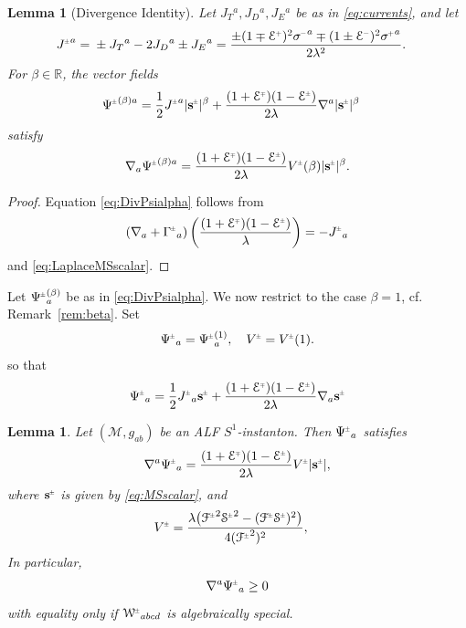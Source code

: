 \documentclass[a4paper,11pt,reqno]{amsart}
\newcommand{\Reals}{\mathbb{R}}
\newcommand{\Scal}{\mathop{\rm Scal}}
\newcommand{\cM}{\mathcal{M}}
\theoremstyle{plain}
\newtheorem{lemma}[thm]{Lemma}
\renewcommand{\P}[1]{{{#1}^{\hspace{-.5pt}\scaleto{+}{4pt}}}}
\newcommand{\M}[1]{{{#1}^{\hspace{-.5pt}\scaleto{-}{4pt}}}}
\newcommand{\PM}[1]{{{#1}^{\hspace{-.5pt}\scaleto{\pm}{3.5pt}}}}
\newcommand{\MP}[1]{{{#1}^{\hspace{-.5pt}\scaleto{\mp}{3.5pt}}}}
\def\Wcal{\mathcal{W}}
\def\Fcal{\mathcal{F}}
\def\Ecal{\mathcal{E}}
\def\Scal{\mathcal{S}}
\def\sbold{\mathbf{s}}
\numberwithin{equation}{section}
\begin{document}
\begin{lemma}[Divergence Identity]
Let $J_{T}{}^{a}, J_{D}{}^{a}, J_{E}{}^{a}$ be as in \eqref{eq:currents}, and let  
\begin{align} \label{eq:Jcurrdef}
\PM{J}^{a}={}&\pm J_{T}{}^{a}  - 2 J_{D}{}^{a} \pm J_{E}{}^{a}
 = \frac{\pm (1 \mp \P{\Ecal})^2 \M{\sigma}^{a} \mp  (1 \pm \M{\Ecal})^2 \P{\sigma}^{a}}{2 \lambda^2}.
\end{align} 
For $\beta \in \Reals$,  the vector fields
\begin{align}
\PM{\Psi}^{(\beta)a}={}& \frac{1}{2} \PM{J}^{a} |\PM{\sbold}|^\beta
+ \frac{(1+\MP{\Ecal})(1-\PM{\Ecal})}{2\lambda}\nabla^{a}|\PM{\sbold}|^\beta
\end{align}
satisfy
\begin{align} \label{eq:DivPsialpha}
\nabla_a \PM{\Psi}^{(\beta)a} = \frac{(1 + \MP{\Ecal}) (1 -  \PM{\Ecal})}{2\lambda} \PM{V}(\beta) |\PM{\sbold}|^\beta.
\end{align}
\end{lemma}
\begin{proof}
Equation \eqref{eq:DivPsialpha} follows from 
\begin{align}
\left( \nabla_a + \PM{\Gamma}_a \right) \left( \frac{(1+\MP{\Ecal})(1-\PM{\Ecal})}{\lambda}\right) = - \PM{J}_{a} 
\end{align}
and \eqref{eq:LaplaceMSscalar}.
\end{proof}


%




Let $\PM{\Psi}^{(\beta)}_a$ be as in \eqref{eq:DivPsialpha}. We now restrict to the case $\beta=1$, cf. Remark~\ref{rem:beta}. 
Set  
\begin{align} 
\PM{\Psi}_a  = \PM{\Psi}^{(1)}_a  , \quad \PM{V} = \PM{V}(1) .
\end{align}
so that
\begin{align}  \label{eq:Psi-def} 
\PM{\Psi}_a
= \frac{1}{2}\PM{J}_a \PM{\sbold}
+ \frac{(1+\MP{\Ecal})(1-\PM{\Ecal})}{2\lambda}\nabla_{a} \PM{\sbold}
\end{align}

\begin{lemma} \label{lem:magic}  
Let $(\cM, g_{ab})$ be an ALF $S^1$-instanton. Then $\PM{\Psi}_a$ satisfies
\begin{align} \label{eq:divmagic} 
\nabla^a \PM{\Psi}_a = \frac{(1 + \MP{\Ecal}) (1 -  \PM{\Ecal})}{2\lambda} \PM{V} |\PM{\sbold}| ,
\end{align}
where $\PM{\sbold}$ is given by \eqref{eq:MSscalar}, and 
\begin{align}
\PM{V} ={}& \frac{\lambda \bigl(\PM{\Fcal}^2 \PM{\Scal}^2 - (\PM{\Fcal}\PM{\Scal})^2 \bigr) }{4 (\PM{\Fcal}^2)^2}, \label{eq:Vpm1}
\end{align} 
In particular, 
\begin{align} 
\nabla^a \PM{\Psi}_a \geq 0
\end{align} 
with equality only if $\PM{\Wcal}_{abcd}$ is algebraically special.  
\end{lemma}
\end{document}
